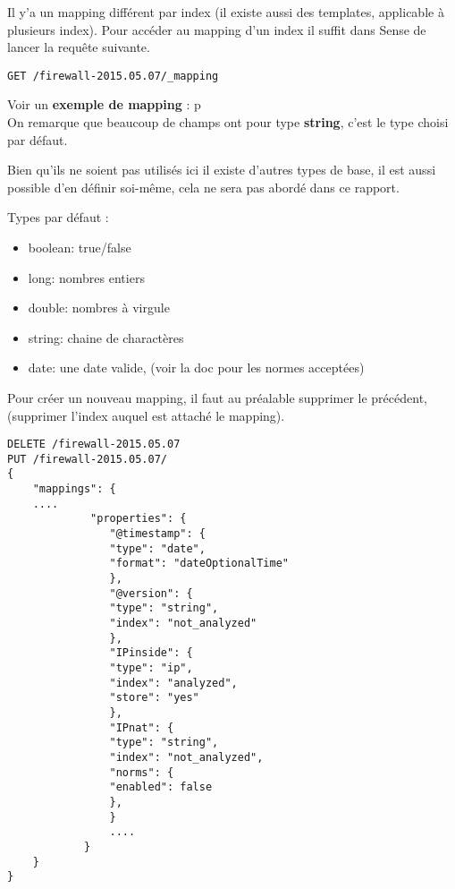 {Il y'a un mapping différent par index (il existe aussi des templates, applicable 
à plusieurs index). Pour accéder au mapping d'un index il suffit dans Sense de lancer
la requête suivante.

\begin{lstlisting}[style=code,label={lst:mappingget1},caption={Obtenir un mapping}]
GET /firewall-2015.05.07/_mapping
\end{lstlisting}

Voir un \textbf{exemple de mapping} : p\pageref{lst:mappingresult}\\[2mm]



On remarque que beaucoup de champs ont pour type \textbf{string}, c'est le type choisi
par défaut.

Bien qu'ils ne soient pas utilisés ici il existe d'autres types de base, il est aussi
possible d'en définir soi-même, cela ne sera pas abordé dans ce rapport.

Types par défaut :
\begin{itemize}
    \item   boolean: true/false
    \item   long: nombres entiers
    \item   double: nombres à virgule
    \item   string: chaine de charactères
    \item   date:   une date valide, (voir la doc pour les normes acceptées)
\end{itemize}

Pour créer un nouveau mapping, il faut au préalable supprimer le précédent, (supprimer 
l'index auquel est attaché le mapping).


\begin{lstlisting}[style=code,label={lst:mappingiput1},caption={Changer le mapping d'un index}]
DELETE /firewall-2015.05.07
PUT /firewall-2015.05.07/
{
    "mappings": {
    ....
             "properties": {
                "@timestamp": {
                "type": "date",
                "format": "dateOptionalTime"
                },
                "@version": {
                "type": "string",
                "index": "not_analyzed"
                },
                "IPinside": {
                "type": "ip",
                "index": "analyzed",
                "store": "yes"
                },
                "IPnat": {
                "type": "string",
                "index": "not_analyzed",
                "norms": {
                "enabled": false
                },
                }
                ....
            }
    }
}
\end{lstlisting}

}
